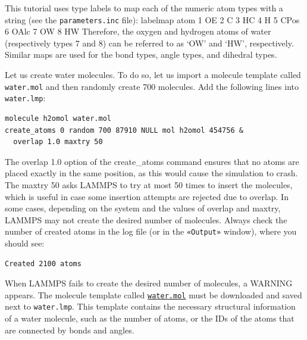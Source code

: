 \documentclass[9pt,tutorial]{livecoms}
\newcommand{\lmpcmd}[1]{\hspace{0pt}\colorbox{listing}{\textcolor{command}{\small{#1}}}\hspace{0pt}} %
\newcommand{\lmpcmdnote}[1]{\hspace{0pt}\colorbox{note_listing}{\textcolor{command}{\small{#1}}}\hspace{0pt}} %
\newcommand{\flecmd}[1]{\textcolor{command}{\texttt{#1}}} %
\newcommand{\guicmd}[1]{\textcolor{command}{\texttt{«#1»}}} %
\newcommand{\dwlcmd}[1]{\textcolor{download}{\texttt{#1}}} %
\newcommand{\filepath}{https://raw.githubusercontent.com/lammpstutorials/lammpstutorials-article/main/files/}
\begin{document}
\begin{note}
This tutorial uses type labels \cite{typelabel_paper} to map each of the
numeric atom types with a string (see the \flecmd{parameters.inc} file):
\lmpcmdnote{labelmap atom 1 OE 2 C 3 HC 4 H 5 CPos 6 OAlc 7 OW 8 HW}
Therefore, the oxygen and hydrogen atoms of water (respectively types 7 and 8)
can be referred to as `OW' and `HW', respectively.  Similar maps are used for 
the bond types, angle types, and dihedral types.
\end{note}

Let us create water molecules.  To do so, let us import a molecule template called
\flecmd{water.mol} and then randomly create 700 molecules.  Add the following
lines into \flecmd{water.lmp}:
\begin{lstlisting}
molecule h2omol water.mol
create_atoms 0 random 700 87910 NULL mol h2omol 454756 &
  overlap 1.0 maxtry 50
\end{lstlisting}
The \lmpcmd{overlap 1.0} option of the \lmpcmd{create\_atoms} command ensures
that no atoms are placed exactly in the same position, as this would cause the
simulation to crash.  The \lmpcmd{maxtry 50} asks LAMMPS to try at most 50 times
to insert the molecules, which is useful in case some insertion attempts are
rejected due to overlap.  In some cases, depending on the system and the values
of \lmpcmd{overlap} and \lmpcmd{maxtry}, LAMMPS may not create the desired number
of molecules.  Always check the number of created atoms in the \lmpcmd{log} file
(or in the \guicmd{Output} window), where you should see:
\begin{lstlisting}
Created 2100 atoms
\end{lstlisting}
When LAMMPS fails to create the desired number of molecules, a WARNING appears.
The molecule template called \href{\filepath tutorial3/water.mol}{\dwlcmd{water.mol}}
must be downloaded and saved next to \flecmd{water.lmp}.  This template contains
the necessary structural information of a water molecule, such as the number of
atoms, or the IDs of the atoms that are connected by bonds and angles.
\end{document}
